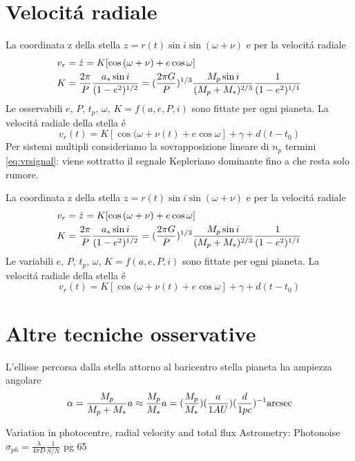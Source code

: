 \section{Velocit\'a radiale}


\begin{workout}
La coordinata z della stella $z=r(t)\sin{i}\sin{(\omega+\nu)}$ e per la velocit\'a radiale
\begin{align}
&v_r=\dot{z}=K[\cos{(\omega+\nu)}+e\cos{\omega}]\\
&K=\frac{2\pi}{P}\frac{a_*\sin{i}}{(1-e^2)\expy{1/2}}=(\frac{2\pi G}{P})\expy{1/3}\frac{M_p\sin{i}}{(M_p+M_*)\expy{2/3}}\frac{1}{(1-e^2)\expy{1/1}}
\end{align}
Le osservabili $e$, $P$, $t_p$, $\omega$, $K=f(a,e,P,i)$ sono fittate per ogni pianeta.
La velocit\'a radiale della stella \'e
\begin{equation}
v_r(t)=K[\cos{(\omega+\nu(t)}+e\cos{\omega}]+\gamma+d(t-t_0)
\end{equation}
Per sistemi multipli consideriamo la sovrapposizione lineare di $n_p$ termini \eqref{eq:vrsignal}: viene sottratto il segnale Kepleriano dominante fino a che resta solo rumore.
\end{workout}

\begin{workout}
La coordinata z della stella $z=r(t)\sin{i}\sin{(\omega+\nu)}$ e per la velocit\'a radiale
\begin{align}
&v_r=\dot{z}=K[\cos{(\omega+\nu)}+e\cos{\omega}]\\
&K=\frac{2\pi}{P}\frac{a_*\sin{i}}{(1-e^2)\expy{1/2}}=(\frac{2\pi G}{P})\expy{1/3}\frac{M_p\sin{i}}{(M_p+M_*)\expy{2/3}}\frac{1}{(1-e^2)\expy{1/1}}
\end{align}
Le variabili $e$, $P$, $t_p$, $\omega$, $K=f(a,e,P,i)$ sono fittate per ogni pianeta.
La velocit\'a radiale della stella \'e
\begin{equation}
v_r(t)=K[\cos{(\omega+\nu(t)}+e\cos{\omega}]+\gamma+d(t-t_0)
\end{equation}
\end{workout}


\section{Altre tecniche osservative}
\begin{workout}[Astrometry]
L'ellisse percorsa dalla stella attorno al baricentro stella pianeta ha ampiezza angolare
\begin{equation}
\alpha=\frac{M_p}{M_p+M_*}a\approx\frac{M_p}{M_*}a=(\frac{M_p}{M_*})(\frac{a}{1AU})(\frac{d}{1pc})\expy{-1}\si{\arcsec}
\end{equation}

Variation in photocentre, radial velocity and total flux
Astrometry: Photonoise $\sigma_{ph}=\frac{\lambda}{4\pi D}\frac{1}{S/N}$
pg 65

\end{workout}

